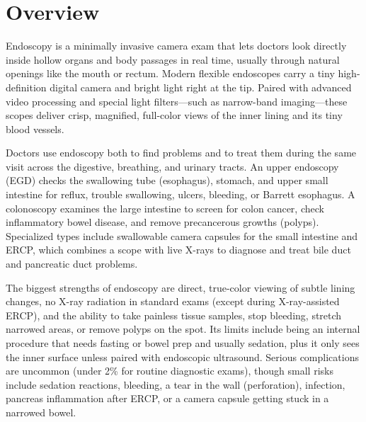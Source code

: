 \label{ch:infographic-endoscopy}

\section{Overview}

Endoscopy is a minimally invasive camera exam that lets doctors look directly inside hollow organs and body passages in real time, usually through natural openings like the mouth or rectum. Modern flexible endoscopes carry a tiny high-definition digital camera and bright light right at the tip. Paired with advanced video processing and special light filters---such as narrow-band imaging---these scopes deliver crisp, magnified, full-color views of the inner lining and its tiny blood vessels.

Doctors use endoscopy both to find problems and to treat them during the same visit across the digestive, breathing, and urinary tracts. An upper endoscopy (EGD) checks the swallowing tube (esophagus), stomach, and upper small intestine for reflux, trouble swallowing, ulcers, bleeding, or Barrett esophagus. A colonoscopy examines the large intestine to screen for colon cancer, check inflammatory bowel disease, and remove precancerous growths (polyps). Specialized types include swallowable camera capsules for the small intestine and ERCP, which combines a scope with live X-rays to diagnose and treat bile duct and pancreatic duct problems.

The biggest strengths of endoscopy are direct, true-color viewing of subtle lining changes, no X-ray radiation in standard exams (except during X-ray-assisted ERCP), and the ability to take painless tissue samples, stop bleeding, stretch narrowed areas, or remove polyps on the spot. Its limits include being an internal procedure that needs fasting or bowel prep and usually sedation, plus it only sees the inner surface unless paired with endoscopic ultrasound. Serious complications are uncommon (under 2\% for routine diagnostic exams), though small risks include sedation reactions, bleeding, a tear in the wall (perforation), infection, pancreas inflammation after ERCP, or a camera capsule getting stuck in a narrowed bowel.



